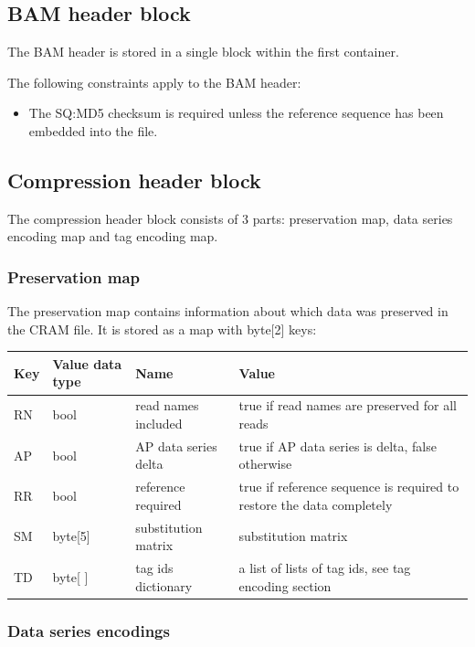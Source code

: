 \documentclass[a4paper]{article}
\begin{document}
\subsection{\textbf{BAM header block}}

The BAM header is stored in a single block within the first container. 

The following constraints apply to the BAM header: 

\begin{itemize}
\item The SQ:MD5 checksum is required unless the reference sequence has been embedded 
into the file.
\end{itemize}

\subsection{\textbf{Compression header block}}
\label{subsec:compression-header}

The compression header block consists of 3 parts: preservation map, data series 
encoding map and tag encoding map.

\subsubsection*{Preservation map}

The preservation map contains information about which data was preserved in the 
CRAM file. It is stored as a map with byte[2] keys:

\begin{tabular}{|l|l|>{\raggedright}p{100pt}|>{\raggedright}p{220pt}|}
\hline
\textbf{Key} & \textbf{Value data type} & \textbf{Name} & \textbf{Value}\tabularnewline
\hline
RN & bool & read names included & true if read names are preserved for all reads\tabularnewline
\hline
AP & bool & AP data series delta & true if AP data series is delta, false otherwise\tabularnewline
\hline
RR & bool & reference required & true if reference sequence is required to restore 
the data completely\tabularnewline
\hline
SM & byte[5] & substitution matrix & substitution matrix\tabularnewline
\hline
TD & byte[ ] & tag ids dictionary & a list of lists of tag ids, see tag encoding 
section\tabularnewline
\hline
\end{tabular}

\subsubsection*{Data series encodings}
\end{document}
